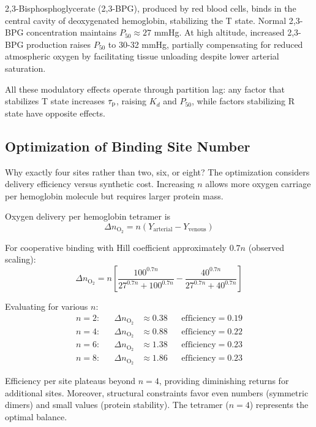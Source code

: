 2,3-Bisphosphoglycerate (2,3-BPG), produced by red blood cells, binds in the central cavity of deoxygenated hemoglobin, stabilizing the T state. Normal 2,3-BPG concentration maintains $P_{50} \approx 27$ mmHg. At high altitude, increased 2,3-BPG production raises $P_{50}$ to 30-32 mmHg, partially compensating for reduced atmospheric oxygen by facilitating tissue unloading despite lower arterial saturation.

All these modulatory effects operate through partition lag: any factor that stabilizes T state increases $\tau_{\mathrm{p}}$, raising $K_{d}$ and $P_{50}$, while factors stabilizing R state have opposite effects.

\subsection{Optimization of Binding Site Number}

Why exactly four sites rather than two, six, or eight? The optimization considers delivery efficiency versus synthetic cost. Increasing $n$ allows more oxygen carriage per hemoglobin molecule but requires larger protein mass.

Oxygen delivery per hemoglobin tetramer is
\begin{equation}
\Delta n_{\mathrm{O}_{2}} = n(Y_{\mathrm{arterial}} - Y_{\mathrm{venous}})
\end{equation}

For cooperative binding with Hill coefficient approximately $0.7n$ (observed scaling):
\begin{equation}
\Delta n_{\mathrm{O}_{2}} = n\left[\frac{100^{0.7n}}{27^{0.7n} + 100^{0.7n}} - \frac{40^{0.7n}}{27^{0.7n} + 40^{0.7n}}\right]
\end{equation}

Evaluating for various $n$:
\begin{align}
n = 2: &&\Delta n_{\mathrm{O}_{2}} &\approx 0.38 &&\text{efficiency} = 0.19 \\
n = 4: &&\Delta n_{\mathrm{O}_{2}} &\approx 0.88 &&\text{efficiency} = 0.22 \\
n = 6: &&\Delta n_{\mathrm{O}_{2}} &\approx 1.38 &&\text{efficiency} = 0.23 \\
n = 8: &&\Delta n_{\mathrm{O}_{2}} &\approx 1.86 &&\text{efficiency} = 0.23
\end{align}

Efficiency per site plateaus beyond $n = 4$, providing diminishing returns for additional sites. Moreover, structural constraints favor even numbers (symmetric dimers) and small values (protein stability). The tetramer ($n = 4$) represents the optimal balance.

